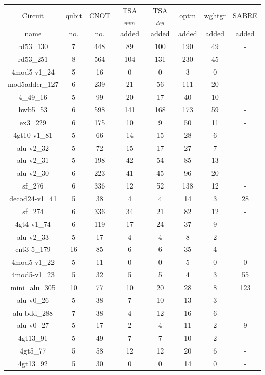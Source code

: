 \documentclass[runningheads]{llncs}
\begin{document}
	\begin{table}[H]
		\begin{center}  
		\begin{tabular}{|c|c|c|c|c|c|c|c|}
		\hline
		Circuit &  qubit  & CNOT &TSA$_{num}$& TSA$_{dep}$  & optm 	 & wghtgr  &SABRE 	\\
		 name	&   no. 	&	no. & added&  added &  added 	&  added &  added\\
		\hline
		rd53\_130 & 7 & 448 & 89 & 100 & 190 & 49& - \\
rd53\_251 & 8 & 564 & 104 & 131 & 230 & 45& - \\
4mod5-v1\_24 & 5 & 16 & 0 & 0 & 3 & 0& - \\
mod5adder\_127 & 6 & 239 & 21 & 56 & 111 & 20& - \\
4\_49\_16 & 5 & 99 & 20 & 17 & 40 & 10& - \\
hwb5\_53 & 6 & 598 & 141 & 168 & 173 & 59& - \\
ex3\_229 & 6 & 175 & 10 & 9 & 50 & 11& - \\
4gt10-v1\_81 & 5 & 66 & 14 & 15 & 28 & 6& - \\
alu-v2\_32 & 5 & 72 & 15 & 17 & 27 & 7& - \\
alu-v2\_31 & 5 & 198 & 42 & 54 & 85 & 13& - \\
alu-v2\_30 & 6 & 223 & 41 & 45 & 96 & 20& - \\
sf\_276 & 6 & 336 & 12 & 52 & 138 & 12& - \\
decod24-v1\_41 & 5 & 38 & 4 & 4 & 14 & 3& 28 \\
sf\_274 & 6 & 336 & 34 & 21 & 82 & 12& - \\
4gt4-v1\_74 & 6 & 119 & 17 & 24 & 37 & 9& - \\
alu-v2\_33 & 5 & 17 & 4 & 4 & 8 & 2& - \\
cnt3-5\_179 & 16 & 85 & 6 & 6 & 35 & 4& - \\
4mod5-v1\_22 & 5 & 11 & 0 & 0 & 5 & 0&0 \\
4mod5-v1\_23 & 5 & 32 & 5 & 5 & 4 & 3& 55\\
mini\_alu\_305 & 10 & 77 & 10 & 20 & 28 & 8& 123 \\
alu-v0\_26 & 5 & 38 & 7 & 10 & 13 & 3& - \\
alu-bdd\_288 & 7 & 38 & 4 & 12 & 16 & 6& - \\
alu-v0\_27 & 5 & 17 & 2 & 4 & 11 & 2& 9 \\
4gt13\_91 & 5 & 49 & 7 & 7 & 10 & 2& - \\
4gt5\_77 & 5 & 58 & 12 & 12 & 20 & 6& - \\
4gt13\_92 & 5 & 30 & 0 & 0 & 14 & 0& - \\

\end{tabular}
\end{center}
\end{table}
\end{document}
